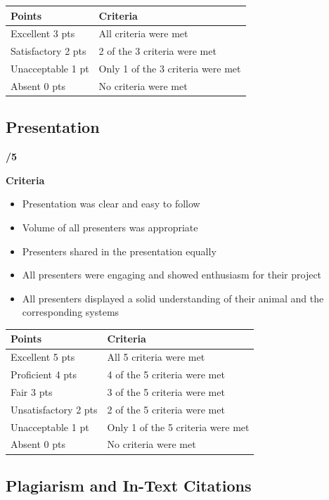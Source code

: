 \documentclass[
]{book}
\providecommand{\tightlist}{%
  \setlength{\itemsep}{0pt}\setlength{\parskip}{0pt}}
\begin{document}
\begin{longtable}[]{@{}ll@{}}
\toprule()
Points & Criteria \\
\midrule()
\endhead
Excellent 3 pts & All criteria were met \\
Satisfactory 2 pts & 2 of the 3 criteria were met \\
Unacceptable 1 pt & Only 1 of the 3 criteria were met \\
Absent 0 pts & No criteria were met \\
\bottomrule()
\end{longtable}

\hypertarget{presentation}{%
\subsection*{Presentation}\label{presentation}}

\textbf{/5}

\textbf{Criteria}

\begin{itemize}
\tightlist
\item
  Presentation was clear and easy to follow
\item
  Volume of all presenters was appropriate
\item
  Presenters shared in the presentation equally
\item
  All presenters were engaging and showed enthusiasm for their project
\item
  All presenters displayed a solid understanding of their animal and the corresponding systems
\end{itemize}

\begin{longtable}[]{@{}ll@{}}
\toprule()
Points & Criteria \\
\midrule()
\endhead
Excellent 5 pts & All 5 criteria were met \\
Proficient 4 pts & 4 of the 5 criteria were met \\
Fair 3 pts & 3 of the 5 criteria were met \\
Unsatisfactory 2 pts & 2 of the 5 criteria were met \\
Unacceptable 1 pt & Only 1 of the 5 criteria were met \\
Absent 0 pts & No criteria were met \\
\bottomrule()
\end{longtable}

\hypertarget{plagiarism-and-in-text-citations}{%
\subsection*{Plagiarism and In-Text Citations}\label{plagiarism-and-in-text-citations}}
\end{document}
